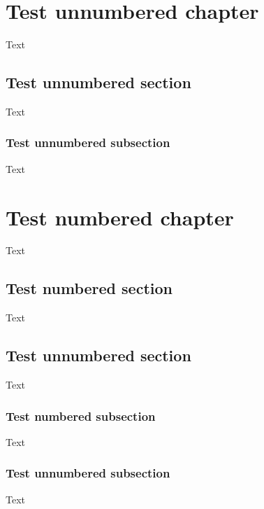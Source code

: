 \documentclass{scrbook}
\begin{document}
\tableofcontents

\bigskip
\chapter*{Test unnumbered chapter}
Text
\section*{Test unnumbered section}
Text
\subsection*{Test unnumbered subsection}
Text

\chapter{Test numbered chapter}
Text
\section{Test numbered section}
Text
\section*{Test unnumbered section}
Text
\subsection{Test numbered subsection}
Text
\subsection*{Test unnumbered subsection}
Text
\end{document}
